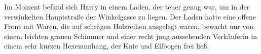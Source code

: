 Im Moment befand sich Harry in einem Laden, der teuer genug war, um in der verwinkelten Hauptstraße der Winkelgasse zu liegen. Der Laden hatte eine offene Front mit Waren, die auf schrägen Holzreihen ausgelegt waren, bewacht nur von einem leichten grauen Schimmer und einer recht jung aussehenden Verkäuferin in einem sehr kurzen Hexenumhang, der Knie und Ellbogen frei ließ.

